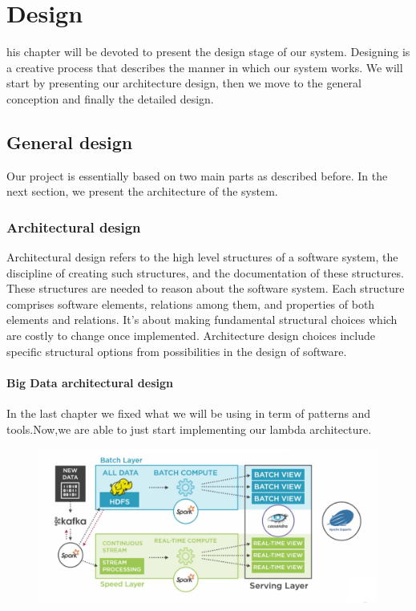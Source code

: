 %
%
\let\textcircled=\pgftextcircled
\chapter{Design}
\label{chap:intro}

his chapter will be devoted to present the design stage of our system. 
Designing is a creative process that describes the manner in which our system works.
We will start by presenting our architecture design, then we move to the general conception and 
finally the detailed design.	

\section{ General design }
Our project is essentially based on two main parts as described before.
 In the next section, we present the architecture of the system.
\subsection{ Architectural design }
Architectural design refers to the high level structures of a software system, 
the discipline of creating such structures, and the documentation of these structures. 
These structures are needed to reason about the software system. 
Each structure comprises software elements, relations among them, and properties of both elements and relations.
It's about making fundamental structural choices which are costly to change once implemented. 
Architecture design choices include specific structural options from possibilities in the design of software. 
\subsubsection{ Big Data architectural design }
In the last chapter we fixed what we will be using in term of patterns and tools.Now,we are able to just
 start implementing our lambda architecture.
\begin{figure}[h!]
	\centering
	\includegraphics[height=0.3\textheight]{fig01/lambdaImplementation}
	\label{fig:FilialesEtClients}
\end{figure}
